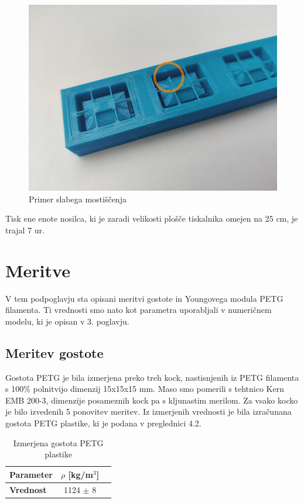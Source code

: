 \documentclass[12pt]{report}
\begin{document}
\begin{figure}[H]
  \centering
  \includegraphics[scale=0.4]{Images/mostiscenje_small.jpg}
  \caption{Primer slabega mostiščenja}
\end{figure}
\noindent Tisk ene enote nosilca, ki je zaradi velikosti plošče tiskalnika omejen na 25 cm, je trajal 7 ur.

\section{Meritve}
V tem podpoglavju sta opisani meritvi gostote in Youngovega modula PETG filamenta. Ti vrednosti smo nato kot parametra uporabljali v numeričnem modelu, ki
je opisan v 3. poglavju. 

\subsection{Meritev gostote}
Gostota PETG je bila izmerjena preko treh kock, nastisnjenih iz PETG filamenta s 100\% polnitvijo dimenzij 15x15x15 mm. Maso smo pomerili s tehtnico Kern EMB 200-3, dimenzije posameznih
kock pa s kljunastim merilom. Za vsako kocko je bilo izvedenih 5 ponovitev meritev. Iz izmerjenih vrednosti je bila izračunana gostota PETG plastike, ki je podana v preglednici 4.2.

\begin{table}[H]
  \caption{Izmerjena gostota PETG plastike}
  \centering
  \begin{tabular}{ | l | c | r | }
    \hline
    \textbf{Parameter} & $\rho$ [kg/m$^3$] \\ \hline
    \textbf{Vrednost} & 1124 $\pm$ 8 \\
    \hline  
  \end{tabular}
\end{table}
\end{document}
